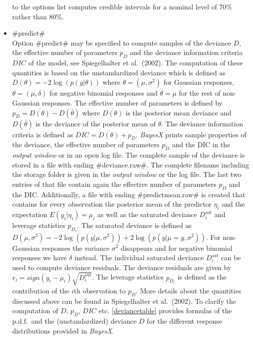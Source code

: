 \begin{itemize}
to the options list computes credible intervals for a nominal
level of 70\% rather than 80\%.

\item \label{predict} #predict# \\
  
   
Option #predict# may be specified to compute samples of the
deviance $D$, the effective number of parameters $p_D$ and the
deviance information criteria $DIC$ of the model, see
Spiegelhalter et al.~(2002). The computation of these quantities
is based on the unstandardized deviance which is defined as
$D(\theta) = -2\log(p(y|\theta))$ where $\theta = (\mu,\sigma^2)$
for Gaussian responses, $\theta = (\mu,\delta)$ for negative
binomial responses  and $\theta = \mu$ for the rest of non-Gaussian
responses. The effective number of parameters is defined by $p_D =
\overline{D(\theta)} - D(\bar{\theta})$ where
$\overline{D(\theta)}$ is the posterior mean deviance and
$D(\bar{\theta})$ is the deviance of the posterior mean of
$\theta$. The deviance information criteria is defined as $DIC =
\overline{D(\theta)} + p_D$. {\em BayesX} prints sample properties
of the deviance, the effective number of parameters $p_D$ and the
DIC in the {\em output window} or in an open log file. The
complete sample of the deviance is stored in a file with ending
#deviance.raw#. The complete filename including the storage
folder is given in the {\em output window} or the log file. The
last two entries of that file contain again the effective number
of parameters $p_D$ and the DIC. Additionally, a file with ending
#predictmean.raw# is created that contains for every observation
the posterior mean of the predictor $\eta_i$ and the expectation
$E(y_i | \eta_i) = \mu_i$ as well as the saturated deviance
$D^{sat}_i$ and leverage statistics $p_{D_i}$. The saturated
deviance is defined as $D(\mu,\sigma^2) =
-2\log(p(y|\mu,\sigma^2))+2\log(p(y|\mu=y,\sigma^2))$. For
non-Gaussian responses the variance $\sigma^2$ disappears and for
negative binomial responses we have $\delta$ instead. The
individual saturated deviance $D^{sat}_i$ can be used to compute
deviance residuals. The deviance residuals are given by $r_i =
sign(y_i-\mu_i) \sqrt{D^{sat}_i}$. The leverage statistics
$p_{D_i}$ is defined as the contribution of the $i$th observation
to $p_D$. More details about the quantities discussed above can be
found in Spiegelhalter et al.~(2002). To clarify the computation
of $D$, $p_D$, $DIC$ etc. \autoref{deviancetable} provides
formulas of the p.d.f.~and the (unstandardized) deviance $D$ for
the different response distributions provided in {\em BayesX}.
\end{itemize}

